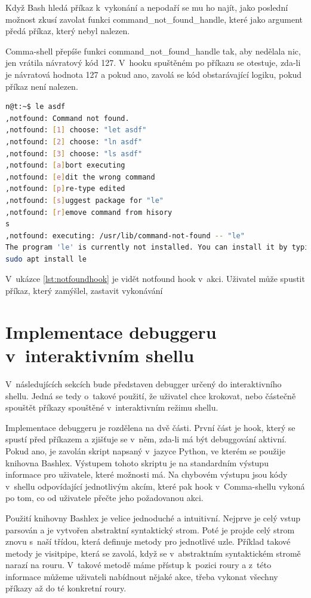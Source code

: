 \documentclass[thesis=M,czech]{FITthesis}[2012/06/26]
\begin{document}
Když Bash hledá příkaz k~vykonání a nepodaří se mu ho najít, jako poslední možnost zkusí zavolat funkci command\_not\_found\_handle, které jako argument předá příkaz, který nebyl nalezen.

Comma-shell přepíše funkci command\_not\_found\_handle tak, aby nedělala nic, jen vrátila návratový kód 127. V~hooku spuštěném po příkazu se otestuje, zda-li je návratová hodnota 127 a pokud ano, zavolá se kód obstarávající logiku, pokud příkaz není nalezen.

\begin{minipage}{\linewidth}
\begin{lstlisting}[language=bash, caption={Explain RC hook}, label={lst:notfoundhook}]
n@t:~$ le asdf
,notfound: Command not found.
,notfound: [1] choose: "let asdf"
,notfound: [2] choose: "ln asdf"
,notfound: [3] choose: "ls asdf"
,notfound: [a]bort executing
,notfound: [e]dit the wrong command
,notfound: [p]re-type edited
,notfound: [s]uggest package for "le"
,notfound: [r]emove command from hisory
s
,notfound: executing: /usr/lib/command-not-found -- "le"
The program 'le' is currently not installed. You can install it by typing:
sudo apt install le
\end{lstlisting}
\end{minipage}

V~ukázce \ref{lst:notfoundhook} je vidět notfound hook v~akci. Uživatel může spustit příkaz, který zamýšlel, zastavit vykonávání

%
%
%
%
%
\section{Implementace debuggeru v~interaktivním shellu}

V~následujících sekcích bude představen debugger určený do interaktivního shellu. Jedná se tedy o~takové použití, že uživatel chce krokovat, nebo částečně spouštět příkazy spouštěné v~interaktivním režimu shellu.

Implementace debuggeru je rozdělena na dvě části. První část je hook, který se spustí před příkazem a zjišťuje se v~něm, zda-li má být debuggování aktivní. Pokud ano, je zavolán skript napsaný v~jazyce Python, ve kterém se použije knihovna Bashlex. Výstupem tohoto skriptu je na standardním výstupu informace pro uživatele, které možnosti má. Na chybovém výstupu jsou kódy v~shellu odpovídající jednotlivým akcím, které pak hook v~Comma-shellu vykoná po tom, co od uživatele přečte jeho požadovanou akci.

Použití knihovny Bashlex je velice jednoduché a intuitivní. Nejprve je celý vstup parsován a je vytvořen abstraktní syntaktický strom. Poté je projde celý strom znovu s~naší třídou, která definuje metody pro jednotlivé uzle. Příklad takové metody je visitpipe, která se zavolá, když se v~abstraktním syntaktickém stromě narazí na rouru. V~takové metodě máme přístup k~pozici roury a z~této informace můžeme uživateli nabídnout nějaké akce, třeba vykonat všechny příkazy až do té konkretní roury.
\end{document}
